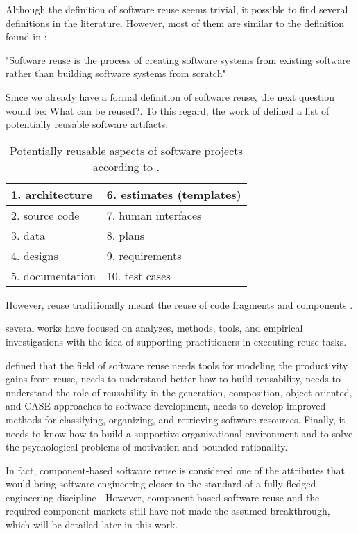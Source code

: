 Although the definition of software reuse seems trivial, it possible to find several definitions in the literature. However, most of them are similar to the definition found in \cite{Krueger1992}:

"Software reuse is the process of creating software systems from existing software rather than building software systems from scratch"

Since we already have a formal definition of software reuse, the next question would be: What can be reused?. To this regard, the work of \cite{Frakes1996} defined a list of potentially reusable software artifacts:

\begin{table}[]
\centering
\label{my-label}
	\begin{tabular}{|l|l|}
		\hline
		1. architecture						 & 6. estimates (templates) \\ \hline
		2. source code  						 & 7. human interfaces      \\ \hline
		3. data                               & 8. plans                 \\ \hline
		4. designs                            & 9. requirements          \\ \hline
		5. documentation                      & 10. test cases           \\ \hline
	\end{tabular}
	\caption{Potentially reusable aspects of software projects according to \cite{Frakes1996}.}
\end{table}

However, reuse traditionally meant the reuse of code fragments and components \cite{Mili2002}. 

several works have focused on analyzes, methods, tools, and empirical investigations with the idea of supporting practitioners in executing reuse tasks. 

\cite{Kim1992} defined that the field of software reuse needs tools for modeling the productivity gains from reuse, needs to understand better how to build reusability, needs to understand the role of reusability in the generation, composition, object-oriented, and CASE approaches to software development, needs to develop improved methods for classifying, organizing, and retrieving software resources. Finally, it needs to know how to build a supportive organizational environment and to solve the psychological problems of motivation and bounded rationality.

In fact, component-based software reuse is considered one of the attributes that would bring software engineering closer to the standard of a fully-fledged engineering discipline \cite{Mili1999}. However, component-based software reuse and the required component markets still have not made the assumed breakthrough, which will be detailed later in this work.

 

